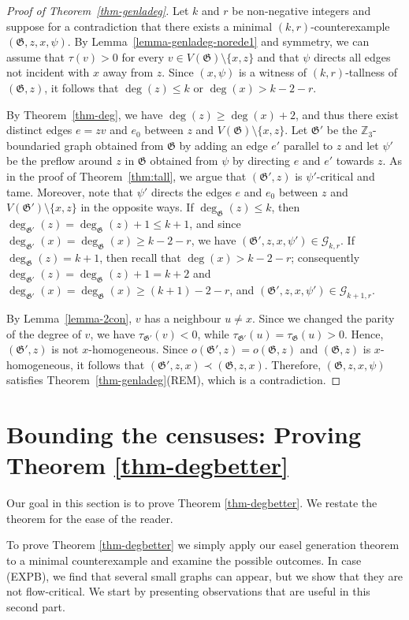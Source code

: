 \documentclass{article}
\newcommand{\Z}{\mathbb{Z}_3}
\newcommand{\GG}{\mathcal{G}}
\newcommand\g{\mathfrak{G}}
\begin{document}
\begin{proof}[Proof of Theorem~\ref{thm-genladeg}]
Let $k$ and $r$ be non-negative integers and suppose for a contradiction that there exists a minimal $(k,r)$-counterexample $(\g,z,x,\psi)$.
By Lemma~\ref{lemma-genladeg-norede1} and symmetry, we can assume that $\tau(v)>0$ for every $v\in V(\g)\setminus\{x,z\}$ and that $\psi$ directs all edges not incident with $x$ away from $z$.
Since $(x,\psi)$ is a witness of $(k,r)$-tallness of $(\g,z)$, it follows that $\deg(z) \le k$ or $\deg(x) >k-2-r$.

By Theorem~\ref{thm-deg}, we have $\deg(z)\ge \deg(x)+2$,
and thus there exist distinct edges $e=zv$ and $e_0$ between $z$ and $V(\g)\setminus \{x,z\}$.
Let $\g'$ be the $\Z$-boundaried graph obtained from $\g$ by adding
an edge $e'$ parallel to $z$ and let $\psi'$ be the preflow around $z$ in $\g$ obtained from $\psi$ by
directing $e$ and $e'$ towards $z$.  As in the proof of Theorem~\ref{thm:tall}, we argue that $(\g',z)$ is $\psi'$-critical and tame.
Moreover, note that $\psi'$ directs the edges $e$ and $e_0$ between $z$ and $V(\g')\setminus \{x,z\}$ in the opposite ways.
If $\deg_{\g}(z)\le k$, then $\deg_{\g'}(z)=\deg_{\g}(z)+1\le k+1$, and since $\deg_{\g'}(x)=\deg_{\g}(x)\ge k-2-r$,
we have $(\g',z,x,\psi')\in\GG_{k,r}$.
If $\deg_{\g}(z)=k+1$, then recall that $\deg(x) >k-2-r$; consequently $\deg_{\g'}(z)=\deg_{\g} (z)+1=k+2$ and
$\deg_{\g'}(x)=\deg_{\g}(x)\ge (k+1)-2-r$, and $(\g',z,x,\psi')\in\GG_{k+1,r}$.

By Lemma~\ref{lemma-2con}, $v$ has a neighbour $u\neq x$.  Since we changed the parity of the degree of $v$, we have $\tau_{\g'}(v)<0$, while $\tau_{\g'}(u)=\tau_{\g}(u)>0$.
Hence, $(\g',z)$ is not $x$-homogeneous.  Since $o(\g',z)=o(\g,z)$ and $(\g,z)$ is $x$-homogeneous, it follows that $(\g',z,x)\prec (\g,z,x)$.
Therefore, $(\g,z,x,\psi)$ satisfies Theorem~\ref{thm-genladeg}(REM), which is a contradiction.
\end{proof}
\section{Bounding the censuses: Proving Theorem \ref{thm-degbetter}}
Our goal in this section is to prove Theorem \ref{thm-degbetter}. We restate the theorem for the ease of the reader.

\thmdegbetter*

To prove Theorem \ref{thm-degbetter} we simply apply our easel generation
theorem to a minimal counterexample and examine the possible outcomes. In case
(EXPB), we find that several small graphs can appear, but we show that
they are not flow-critical.  We start by presenting observations that are useful in this second
part.
\end{document}
